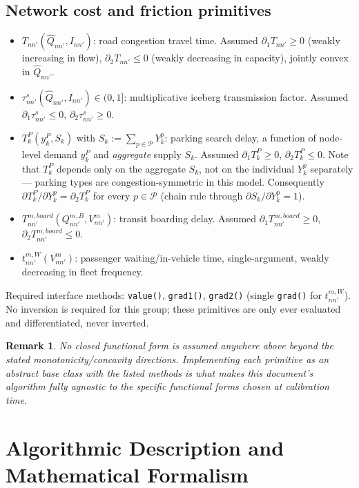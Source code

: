 \documentclass[11pt,a4paper]{article}
\newtheorem{remark}{Remark}
\begin{document}
\subsection{Network cost and friction primitives}
\begin{itemize}[leftmargin=*]
    \item $T_{nn'}(\hat Q_{nn'}, I_{nn'})$: road congestion travel time. Assumed $\partial_1 T_{nn'} \ge 0$ (weakly increasing in flow), $\partial_2 T_{nn'} \le 0$ (weakly decreasing in capacity), jointly convex in $\hat Q_{nn'}$.
    \item $\tau^s_{nn'}(\hat Q_{nn'}, I_{nn'}) \in (0,1]$: multiplicative iceberg transmission factor. Assumed $\partial_1 \tau^s_{nn'} \le 0$, $\partial_2 \tau^s_{nn'} \ge 0$.
    \item $T^P_k(y^P_k, S_k)$ with $S_k := \sum_{p\in\mathcal{P}} Y_k^p$: parking search delay, a function of node-level demand $y^P_k$ and \emph{aggregate} supply $S_k$. Assumed $\partial_1 T^P_k \ge 0$, $\partial_2 T^P_k \le 0$. Note that $T^P_k$ depends only on the aggregate $S_k$, not on the individual $Y_k^p$ separately — parking types are congestion-symmetric in this model. Consequently $\partial T^P_k / \partial Y_k^p = \partial_2 T^P_k$ for every $p \in \mathcal{P}$ (chain rule through $\partial S_k/\partial Y_k^p = 1$).
    \item $T^{m,board}_{nn'}(Q^{m,B}_{nn'}, V^m_{nn'})$: transit boarding delay. Assumed $\partial_1 T^{m,board}_{nn'} \ge 0$, $\partial_2 T^{m,board}_{nn'} \le 0$.
    \item $t^{m,W}_{nn'}(V^m_{nn'})$: passenger waiting/in-vehicle time, single-argument, weakly decreasing in fleet frequency.
\end{itemize}
Required interface methods: \texttt{value()}, \texttt{grad1()}, \texttt{grad2()} (single \texttt{grad()} for $t^{m,W}_{nn'}$). No inversion is required for this group; these primitives are only ever evaluated and differentiated, never inverted.

\begin{remark}
No closed functional form is assumed anywhere above beyond the stated monotonicity/concavity directions. Implementing each primitive as an abstract base class with the listed methods is what makes this document's algorithm fully agnostic to the specific functional forms chosen at calibration time.
\end{remark}

\section{Algorithmic Description and Mathematical Formalism}
\end{document}
